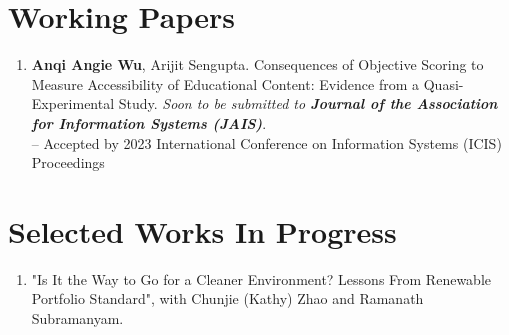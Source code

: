 \documentclass[margin,line]{resume}
\begin{document}
\begin{resume}
\section{\mysidestyle Working Papers}  	  \begin{enumerate}[topsep=0pt, leftmargin=*]     
       \item \textbf{Anqi Angie Wu}, Arijit Sengupta. Consequences of Objective Scoring to Measure Accessibility of Educational Content: Evidence from a Quasi-Experimental Study. \textit{Soon to be submitted to \textbf{Journal of the Association for Information Systems (JAIS)}}.  \\[0.3em]
       -- Accepted by 2023 International Conference on Information Systems (ICIS) Proceedings
\\

       
\end{enumerate}   
  
 	  \section{\mysidestyle Selected Works In Progress} 
 	  \begin{enumerate}[topsep=0pt, leftmargin=*]
         

         \item "Is It the Way to Go for a Cleaner Environment? Lessons From Renewable Portfolio Standard", with Chunjie (Kathy) Zhao and Ramanath Subramanyam.  



\end{enumerate}
\end{resume}
\end{document}
